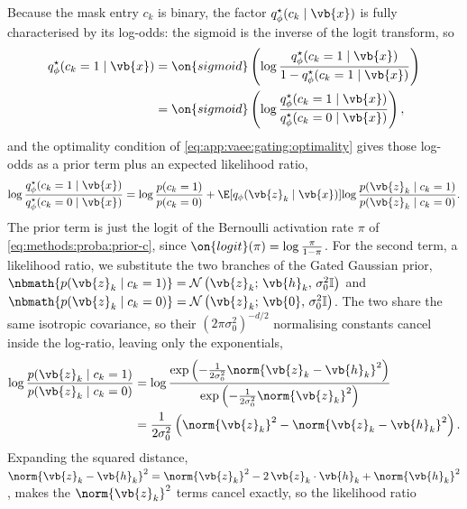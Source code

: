 Because the mask entry $c_k$ is binary, the factor $q_\phi^{\star}(c_k \mid
\vb{x})$ is fully characterised by its log-odds: the sigmoid is the inverse of
the logit transform, so
\begin{equation*}
    \begin{split}
        q_\phi^{\star}(c_k = 1 \mid \vb{x})
        &= \on{sigmoid} \left(\log \frac{q_\phi^{\star}(c_k = 1 \mid \vb{x})}{1 - q_\phi^{\star}(c_k = 1 \mid \vb{x})}\right) \\
        &= \on{sigmoid} \left(\log \frac{q_\phi^{\star}(c_k = 1 \mid \vb{x})}{q_\phi^{\star}(c_k = 0 \mid \vb{x})}\right),
    \end{split}
\end{equation*}
and the optimality condition of \cref{eq:app:vaee:gating:optimality}
gives those log-odds as a prior term plus an expected likelihood
ratio,
\begin{equation*}
    \log \frac{q_\phi^{\star}(c_k = 1 \mid \vb{x})}{q_\phi^{\star}(c_k = 0 \mid \vb{x})} =
    \log \frac{p(c_k = 1)}{p(c_k = 0)} +
    \E[q_\phi(\vb{z}_k \mid \vb{x})]{\log \frac{p(\vb{z}_k \mid c_k = 1)}{p(\vb{z}_k \mid c_k = 0)}}.
\end{equation*}
The prior term is just the logit of the Bernoulli activation rate $\pi$ of
\cref{eq:methods:proba:prior-c}, since $\on{logit}(\pi) =
\log \frac{\pi}{1-\pi}$. For the second term, a likelihood
ratio, we substitute the two branches of the Gated Gaussian prior,
$\nbmath{p(\vb{z}_k \mid c_k = 1)} = \mathcal{N}\left(\vb{z}_k;\, \vb{h}_k,\, \sigma_0^2 \mathbb{I}\right)$
and $\nbmath{p(\vb{z}_k \mid c_k = 0)} = \mathcal{N}\left(\vb{z}_k;\, \vb{0},\, \sigma_0^2 \mathbb{I}\right)$.
The two share the same isotropic covariance, so their $(2\pi\sigma_0^2)^{-d/2}$
normalising constants cancel inside the log-ratio, leaving only the
exponentials,
\begin{equation*}
    \begin{split}
        \log \frac{p(\vb{z}_k \mid c_k = 1)}{p(\vb{z}_k \mid c_k = 0)}
        &= \log \frac{\exp\left(-\frac{1}{2\sigma_0^2}\norm{\vb{z}_k - \vb{h}_k}^2\right)}{\exp\left(-\frac{1}{2\sigma_0^2}\norm{\vb{z}_k}^2\right)} \\
        &= \frac{1}{2\sigma_0^2}\left(\norm{\vb{z}_k}^2 - \norm{\vb{z}_k - \vb{h}_k}^2\right).
    \end{split}
\end{equation*}
Expanding the squared distance,
$\norm{\vb{z}_k - \vb{h}_k}^2 = \norm{\vb{z}_k}^2 - 2\,\vb{z}_k \cdot \vb{h}_k + \norm{\vb{h}_k}^2$,
makes the $\norm{\vb{z}_k}^2$ terms cancel exactly, so the likelihood ratio

